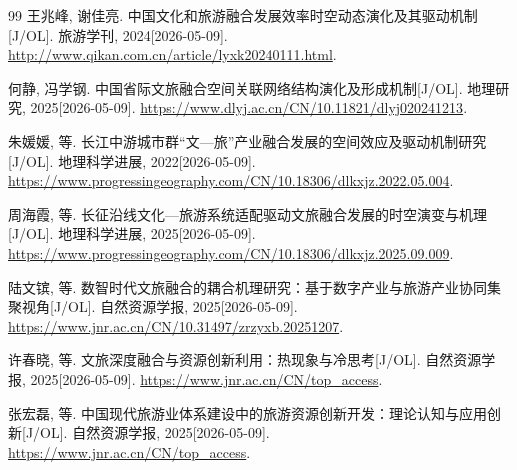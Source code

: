 \begin{thebibliography}{99}
   王兆峰, 谢佳亮. 中国文化和旅游融合发展效率时空动态演化及其驱动机制[J/OL]. 旅游学刊, 2024[2026-05-09]. \url{http://www.qikan.com.cn/article/lyxk20240111.html}.

   何静, 冯学钢. 中国省际文旅融合空间关联网络结构演化及形成机制[J/OL]. 地理研究, 2025[2026-05-09]. \url{https://www.dlyj.ac.cn/CN/10.11821/dlyj020241213}.

   朱媛媛, 等. 长江中游城市群“文—旅”产业融合发展的空间效应及驱动机制研究[J/OL]. 地理科学进展, 2022[2026-05-09]. \url{https://www.progressingeography.com/CN/10.18306/dlkxjz.2022.05.004}.

   周海霞, 等. 长征沿线文化—旅游系统适配驱动文旅融合发展的时空演变与机理[J/OL]. 地理科学进展, 2025[2026-05-09]. \url{https://www.progressingeography.com/CN/10.18306/dlkxjz.2025.09.009}.

   陆文镔, 等. 数智时代文旅融合的耦合机理研究：基于数字产业与旅游产业协同集聚视角[J/OL]. 自然资源学报, 2025[2026-05-09]. \url{https://www.jnr.ac.cn/CN/10.31497/zrzyxb.20251207}.

   许春晓, 等. 文旅深度融合与资源创新利用：热现象与冷思考[J/OL]. 自然资源学报, 2025[2026-05-09]. \url{https://www.jnr.ac.cn/CN/top_access}.

   张宏磊, 等. 中国现代旅游业体系建设中的旅游资源创新开发：理论认知与应用创新[J/OL]. 自然资源学报, 2025[2026-05-09]. \url{https://www.jnr.ac.cn/CN/top_access}.
\end{thebibliography}
